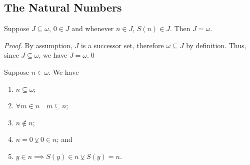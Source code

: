 \documentclass[notoc,notitlepage]{tufte-book}
\begin{document}
\subsection{The Natural Numbers}%
\label{sub:the_natural_numbers}

\begin{thm}
\label{thm:induction_principle}
  Suppose $J \subseteq \omega$, $0 \in J$ and whenever $n \in J$, $S(n) \in J$. Then $J = \omega$.
\end{thm}

\begin{proof}
  By assumption, $J$ is a successor set, therefore $\omega \subseteq J$ by definition. Thus, sinec $J \subseteq \omega$, we have $J = \omega$.\qed
\end{proof}

\begin{lemma}
\label{lemma:properties_of_the_natural_numbers}
  Suppose $n \in \omega$. We have
  \begin{enumerate}
    \item $n \subseteq \omega$;
    \item $\forall m \in n \quad m \subseteq n$;
    \item $n \notin n$;
    \item $n = 0 \veebar 0 \in n$; and
    \item $y \in n \implies S(y) \in n \veebar S(y) = n$.
  \end{enumerate}
\end{lemma}
\end{document}
